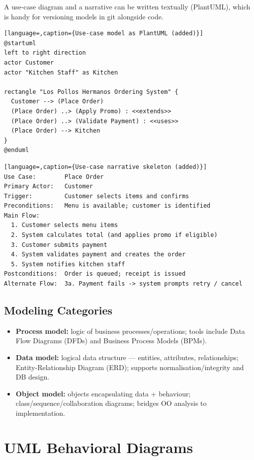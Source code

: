 \documentclass[hidelinks]{article}
\begin{document}
A use-case diagram and a narrative can be written textually (PlantUML), which is handy for
versioning models in git alongside code.
\begin{lstlisting}[language=,caption={Use-case model as PlantUML (added)}]
@startuml
left to right direction
actor Customer
actor "Kitchen Staff" as Kitchen

rectangle "Los Pollos Hermanos Ordering System" {
  Customer --> (Place Order)
  (Place Order) ..> (Apply Promo) : <<extends>>
  (Place Order) ..> (Validate Payment) : <<uses>>
  (Place Order) --> Kitchen
}
@enduml
\end{lstlisting}

\begin{lstlisting}[language=,caption={Use-case narrative skeleton (added)}]
Use Case:        Place Order
Primary Actor:   Customer
Trigger:         Customer selects items and confirms
Preconditions:   Menu is available; customer is identified
Main Flow:
  1. Customer selects menu items
  2. System calculates total (and applies promo if eligible)
  3. Customer submits payment
  4. System validates payment and creates the order
  5. System notifies kitchen staff
Postconditions:  Order is queued; receipt is issued
Alternate Flow:  3a. Payment fails -> system prompts retry / cancel
\end{lstlisting}

\subsection{Modeling Categories}
\begin{itemize}
  \item \textbf{Process model:} logic of business processes/operations; tools include Data Flow
        Diagrams (DFDs) and Business Process Models (BPMs).
  \item \textbf{Data model:} logical data structure --- entities, attributes, relationships;
        Entity-Relationship Diagram (ERD); supports normalisation/integrity and DB design.
  \item \textbf{Object model:} objects encapsulating data + behaviour; class/sequence/collaboration
        diagrams; bridges OO analysis to implementation.
\end{itemize}

\section{UML Behavioral Diagrams}
\end{document}
